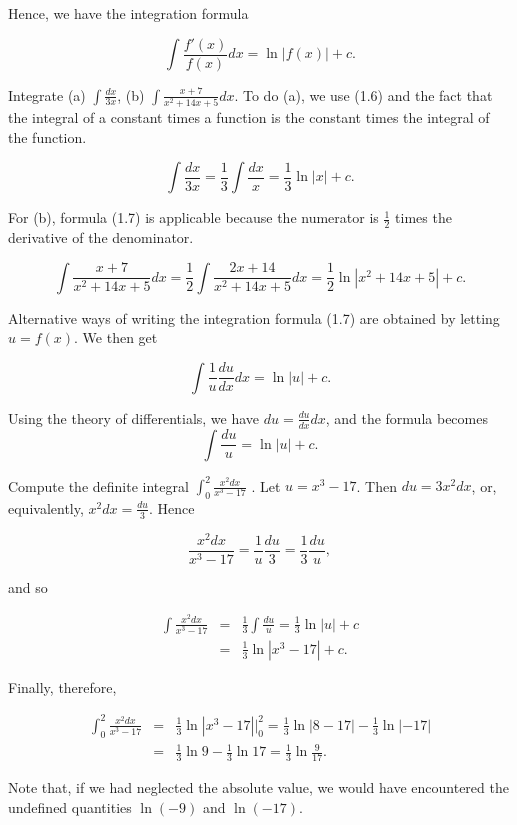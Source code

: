 Hence, we have the integration formula

\begin{theorem} %
$$
\int \frac{f'(x)}{f(x)}dx = \ln |f(x)| + c.
$$
\end{theorem}

\begin{example} Integrate (a) $\int \frac{dx}{3x}$, (b) $\int \frac{x + 7}{x^2 + 14x + 5} dx$. To do (a), we use (1.6) and the fact that the integral of a constant times a function is the constant times the integral of the function.

$$
\int \frac{dx}{3x} = \frac{1}{3} \int \frac{dx}{x} = \frac{1}{3} \ln |x| + c.
$$

\noindent For (b), formula (1.7) is applicable because the numerator is $\frac{1}{2}$ times the derivative of the denominator.

$$
\int \frac{x + 7}{x^2 + 14x + 5} dx = \frac{1}{2} \int \frac{2x + 14}{x^2 + 14x + 5} dx = \frac{1}{2} \ln |x^2 + 14x + 5| + c.
$$

Alternative ways of writing the integration formula (1.7) are obtained by letting $u = f(x)$. We then get

$$
\int \frac{1}{u} \frac{du}{dx} dx = \ln |u| + c .
$$

\noindent Using the theory of differentials, we have $du = \frac{du}{dx}dx$, and the formula becomes
$$
\int \frac{du}{u} = \ln |u| + c. 
$$
\end{example}

\begin{example} Compute the definite integral $\int_{0}^{2} \frac{x^{2}dx}{x^3 - 17}$ . Let $u = x^3 - 17$. Then $du = 3x^{2}dx$, or, equivalently, $x^2dx = \frac{du}{3}$. Hence 

$$
\frac{x^2 dx}{x^3 - 17} = \frac{1}{u} \frac{du}{3} = \frac{1}{3} \frac{du}{u},
$$

\noindent and so

\begin{eqnarray*}
\int \frac{x^2 dx}{x^3 - 17} &=& \frac{1}{3} \int \frac{du}{u} = \frac{1}{3} \ln |u| + c\\
                                          &=& \frac{1}{3} \ln | x^3 - 17 | + c.
\end{eqnarray*}

\noindent Finally, therefore, 

\begin{eqnarray*}
\int_{0}^{2} \frac{x^{2}dx}{x^{3} - 17} 
&=& \frac{1}{3} \ln |x^3 - 17| \Big|_{0}^{2}  
= \frac{1}{3} \ln |8 - 17| - \frac{1}{3} \ln |-17| \\ 
&=& \frac{1}{3} \ln 9 - \frac{1}{3} \ln 17 = \frac{1}{3} \ln \frac{9}{17}. 
\end{eqnarray*}

\noindent Note that, if we had neglected the absolute value, we would have encountered the undefined quantities $\ln(- 9)$ and $\ln( - 17)$.
\end{example}
\medskip

